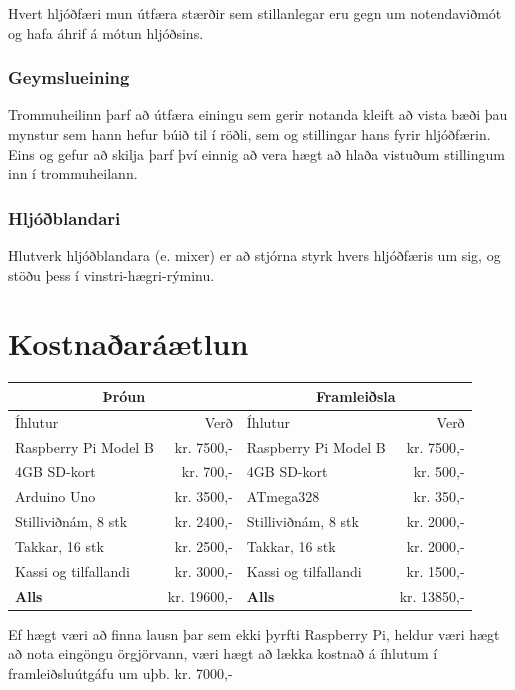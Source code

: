 \documentclass[a4paper,11pt,twocolumn]{article}
\begin{document}
\noindent
Hvert hljóðfæri mun útfæra stærðir sem stillanlegar eru gegn um notendaviðmót og hafa áhrif á mótun hljóðsins.
\subsubsection{Geymslueining}
Trommuheilinn þarf að útfæra einingu sem gerir notanda kleift að vista bæði þau mynstur sem hann hefur búið til í röðli, sem og stillingar hans fyrir hljóðfærin. Eins og gefur að skilja þarf því einnig að vera hægt að hlaða vistuðum stillingum inn í trommuheilann.
\subsubsection{Hljóðblandari}
Hlutverk hljóðblandara (e. mixer) er að stjórna styrk hvers hljóðfæris um sig, og stöðu þess í vinstri-hægri-rýminu.
\section{Kostnaðaráætlun}
\begin{center}
\begin{tabular}{|l|r||l|r|}
	\multicolumn{2}{c}{Þróun} & \multicolumn{2}{c}{Framleiðsla}\\ \hline
	Íhlutur & Verð & Íhlutur & Verð \\ \hline
	Raspberry Pi Model B & kr. 7500,- & Raspberry Pi Model B & kr. 7500,-\\
	4GB SD-kort & kr. 700,- & 4GB SD-kort & kr. 500,- \\
	Arduino Uno & kr. 3500,- & ATmega328 & ~kr. 350,- \\
	Stilliviðnám, 8 stk & kr. 2400,- & Stilliviðnám, 8 stk & kr. 2000,- \\
	Takkar\cite{takkar}, 16 stk & kr. 2500,- & Takkar, 16 stk & kr. 2000,-\\
	Kassi og tilfallandi &  ~kr. 3000,- & Kassi og tilfallandi &  ~kr. 1500,-\\ \hline
	\textbf{Alls} & kr. 19600,- & \textbf{Alls} & kr. 13850,- \\ \hline
	
\end{tabular}
\end{center}

\noindent
Ef hægt væri að finna lausn þar sem ekki þyrfti Raspberry Pi, heldur væri hægt að nota eingöngu örgjörvann, væri hægt að lækka kostnað á íhlutum í framleiðsluútgáfu um uþb. kr. 7000,-
\end{document}
